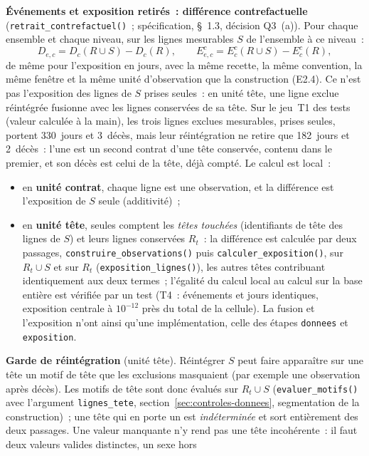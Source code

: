 \documentclass[a4paper,11pt]{article}
\newcommand{\code}[1]{\texttt{\small #1}}
\begin{document}
{\medskip
\textbf{Événements et exposition retirés~: différence contrefactuelle}
(\code{retrait\_contrefactuel()}~; spécification, §~1.3, décision Q3~(a)).
Pour chaque ensemble et chaque niveau, sur les lignes mesurables $S$ de
l'ensemble à ce niveau~:
\[
  D_{e,c} = D_c(R \cup S) - D_c(R), \qquad
  E^c_{e,c} = E^c_c(R \cup S) - E^c_c(R),
\]
de même pour l'exposition en jours, avec la même recette, la même
convention, la même fenêtre et la même unité d'observation que la
construction (E2.4). Ce n'est pas l'exposition des lignes de $S$ prises
seules~: en unité tête, une ligne exclue réintégrée fusionne avec les
lignes conservées de sa tête. Sur le jeu~T1 des tests (valeur calculée à la
main), les trois lignes exclues mesurables, prises seules, portent 330~jours
et 3~décès, mais leur réintégration ne retire que 182~jours et 2~décès~:
l'une est un second contrat d'une tête conservée, contenu dans le premier,
et son décès est celui de la tête, déjà compté. Le calcul est local~:
\begin{itemize}[leftmargin=*, itemsep=2pt]
  \item en \textbf{unité contrat}, chaque ligne est une observation, et la
    différence est l'exposition de $S$ seule (additivité)~;
  \item en \textbf{unité tête}, seules comptent les \emph{têtes touchées}
    (identifiants de tête des lignes de $S$) et leurs lignes conservées
    $R_t$~: la différence est calculée par deux passages,
    \code{construire\_observations()} puis \code{calculer\_exposition()},
    sur $R_t \cup S$ et sur $R_t$ (\code{exposition\_lignes()}), les
    autres têtes contribuant identiquement aux deux termes~; l'égalité du
    calcul local au calcul sur la base entière est vérifiée par un test
    (T4~: événements et jours identiques, exposition centrale à
    $10^{-12}$ près du total de la cellule). La fusion et l'exposition n'ont ainsi qu'une
    implémentation, celle des étapes \code{donnees} et \code{exposition}.
\end{itemize}
\textbf{Garde de réintégration} (unité tête). Réintégrer $S$ peut faire
apparaître sur une tête un motif de tête que les exclusions masquaient
(par exemple une observation après décès). Les motifs de tête sont donc
évalués sur $R_t \cup S$ (\code{evaluer\_motifs()} avec l'argument
\code{lignes\_tete}, section~\ref{sec:controles-donnees}, segmentation de la
construction)~; une tête qui en porte un est \emph{indéterminée} et sort
entièrement des deux passages. Une valeur manquante n'y rend pas une tête
incohérente~: il faut deux valeurs valides distinctes, un sexe hors
}
\end{document}
